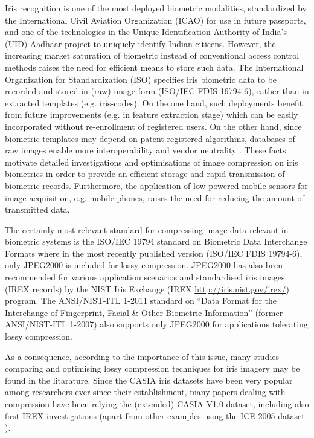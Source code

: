 \documentclass[10pt,twocolumn,letterpaper]{article}
\begin{document}
Iris recognition \cite{BBurge13a,Rathgeb12e} is one of the most deployed biometric
modalities, standardized by the International Civil Aviation
Organization (ICAO) for use in future passports, and one of
the technologies in the Unique Identification Authority of
India's (UID) Aadhaar project to uniquely identify Indian
citicens. However, the increasing market saturation of
biometric instead of conventional access control methods
raises the need for efficient means to store such data. The
International Organization for Standardization (ISO)
specifies iris biometric data to be recorded and stored in (raw)
image form (ISO/IEC FDIS 19794-6), rather than in extracted
templates (e.g. iris-codes). On the one hand, such
deployments benefit from future improvements (e.g. in
feature extraction stage) which can be easily incorporated
without re-enrollment of registered users. On the other hand,
since biometric templates may depend on patent-registered
algorithms, databases of raw images enable more
interoperability and vendor neutrality \cite{Rathgeb12e}. These facts
motivate detailed investigations and optimisations of image
compression on iris biometrics in order to provide an efficient
storage and rapid transmission of biometric records.
Furthermore, the application of low-powered mobile sensors
for image acquisition, e.g. mobile phones, raises the need for
reducing the amount of transmitted data.

The certainly most relevant standard for compressing
image data relevant in biometric systems is the ISO/IEC
19794 standard on Biometric Data Interchange Formats
where in the most recently published version (ISO/IEC FDIS
19794-6), only JPEG2000 is included for lossy compression.
JPEG2000 has also been recommended for various
application scenarios and standardised iris images (IREX
records) by the NIST Iris Exchange  (IREX
\url{http://iris.nist.gov/irex/}) program. The ANSI/NIST-ITL
1-2011 standard on ``Data Format for the Interchange of
Fingerprint, Facial \& Other Biometric Information'' (former
ANSI/NIST-ITL 1-2007) also supports only JPEG2000 for
applications tolerating lossy compression.

As a consequence, according to the importance of this issue, many studies comparing and optimising lossy compression techniques for iris imagery 
may be found in the litarature. Since the CASIA iris datasets have been very popular among researchers ever since their establishment,
many papers dealing with compression have been relying the (extended) CASIA V1.0 dataset, including also first IREX investigations 
\cite{BRakshit07a,BIves08a,Matschitsch07a,Haemmerle09a,Konrad09a} (apart from other examples using the ICE 2005 dataset 
\cite{BDaugman08a,BIves10a}).
	
\end{document}
